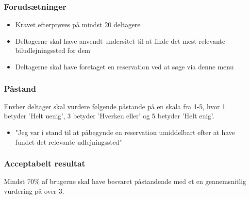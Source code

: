 \documentclass[a4paper,10pt]{article}
\begin{document}
\subsubsection{Forudsætninger}
\begin{itemize}
	\item Kravet efterprøves på mindst 20 deltagere
	\item Deltagerne skal have anvendt undersitet til at finde det mest relevante biludlejningssted for dem
	\item Deltagerne skal have foretaget en reservation ved at søge via denne menu
\end{itemize}
\subsubsection{Påstand}
Envher deltager skal vurdere følgende påstande på en skala fra 1-5, hvor 1 betyder 'Helt uenig', 3 betyder 'Hverken eller' og 5 betyder 'Helt enig'. 

\begin{itemize}
	\item "Jeg var i stand til at påbegynde en reservation umiddelbart efter at have fundet det relevante udlejningssted"
\end{itemize}

\subsubsection{Acceptabelt resultat}
Mindst 70\% af brugerne skal have besvaret påstandende med et en gennemsnitlig vurdering på over 3. 
\end{document}
